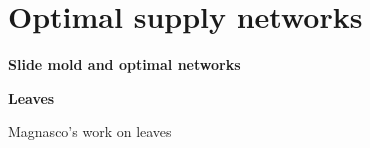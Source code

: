 \section{Optimal supply networks}

  \textbf{Slide mold and optimal networks}


  \textbf{Leaves}

  Magnasco's work on leaves


  

